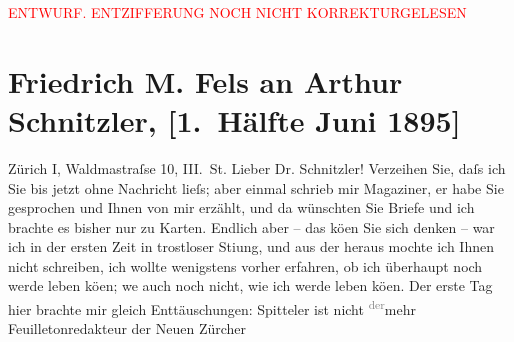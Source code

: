 
\begin{center}
            \textcolor{red}{ENTWURF. ENTZIFFERUNG NOCH NICHT KORREKTURGELESEN}
                      \end{center}
            
               \section[Friedrich M. Fels an Arthur Schnitzler, {[}1. Hälfte Juni 1895{]}]{ Friedrich M. Fels an Arthur Schnitzler, {[}1. Hälfte Juni
                    1895{]}}\nopagebreak{}\rehead{ }\begin{ledgroupsized}[t]{13cm}\normalsize\beginnumbering{} \toendnotes[C]{\smallbreak\pagebreak[2]} 
\toendnotes[C]{\smallbreak}\pstart
           \raggedleft{}{\pb}Zürich I, Waldma{\geminationn}straſse 10, III. St.\pend
           \pstart{}Lieber Dr. Schnitzler!\pend\pstart
           Verzeihen Sie, daſs ich Sie bis jetzt ohne Nachricht lieſs; aber einmal schrieb
                    mir Magaziner, er habe Sie gesprochen und
                    Ihnen von mir erzählt, und da{\geminationn} wünschten Sie Briefe
                    und \introOben{}ich\introOben{} brachte es bisher nur zu Karten. Endlich aber –
                    das kö{\geminationn}en Sie sich denken – war ich in der ersten
                    Zeit in trostloser Sti{\geminationm}ung, und aus der heraus
                    mochte ich Ihnen nicht schreiben, ich wollte wenigstens vorher erfahren, ob ich
                    überhaupt noch werde leben kö{\geminationn}en; we{\geminationn} auch noch nicht, wie ich werde leben kö{\geminationn}en. Der erste Tag hier brachte mir gleich
                    Enttäuschungen: Spitteler ist nicht \substVorne{}\textsuperscript{\textcolor{gray}{der}}\substDazwischen{}mehr\substHinten{} Feuilletonredakteur der Neuen Zürcher

\end{ledgroupsized}
